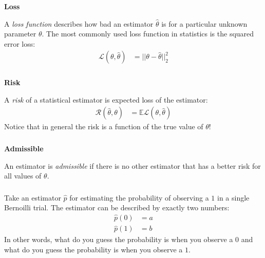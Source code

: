 \begin{frame}[fragile] \frametitle{}

{\bf Loss}

A \textit{loss function} describes how bad an estimator $\widehat{\theta}$
is for a particular unknown parameter $\theta$. The most commonly used loss
function in statistics is the squared error loss:
\begin{align*}
\mathcal{L} (\theta, \widehat{\theta}) &= || \theta - \widehat{\theta}||_2^2
\end{align*}

\end{frame}

\begin{frame}[fragile] \frametitle{}

{\bf Risk}

A \textit{risk} of a statistical estimator is expected loss of the
estimator:
\begin{align*}
\mathcal{R} (\widehat{\theta}, \theta) &= \mathbb{E} \mathcal{L} (\theta, \widehat{\theta})
\end{align*}
\pause Notice that in general the risk is a function of the true value of
$\theta$!

\end{frame}

\begin{frame}[fragile] \frametitle{}

{\bf Admissible}

An estimator is \textit{admissible} if there is no other estimator that has
a better risk  for all values of $\theta$.

\end{frame}

\begin{frame}[fragile] \frametitle{}

Take an estimator $\widehat{p}$ for estimating the probability of observing
a $1$ in a single Bernoilli trial. \pause The estimator can be described by
exactly two numbers:
\begin{align*}
\widehat{p}(0) &= a \\
\widehat{p}(1) &= b
\end{align*}
In other words, what do you guess the probability is when you observe a $0$
and what do you guess the probability is when you observe a $1$.

\end{frame}

